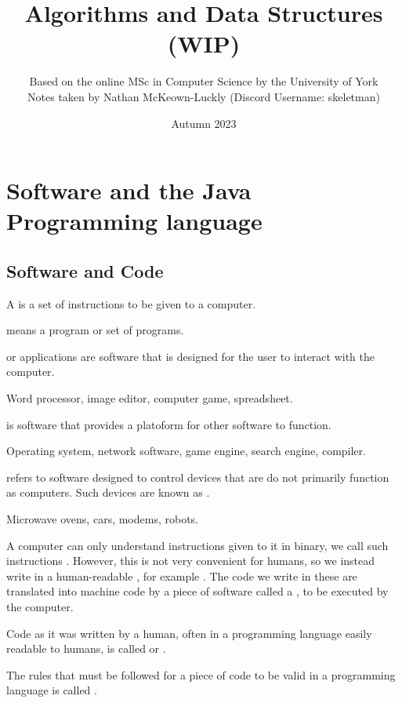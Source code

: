 \documentclass[11pt]{article}
\title{Algorithms and Data Structures (WIP)}
\date{Autumn 2023}
\author{Based on the online MSc in Computer Science by the University of York\\ Notes taken by Nathan McKeown-Luckly (Discord Username: skeletman)}
\begin{document}
\maketitle
\tableofcontents
\pagebreak
\section{Software and the Java Programming language}
\subsection{Software and Code}
\begin{defi}
    A  is a set of instructions to be given to a computer.
\end{defi}
\begin{defi}[Software]
     means a program or set of programs.
\end{defi}
\begin{defi}
     or \textrm{applications} are software that is designed for the user to interact with the computer.
\end{defi}
\begin{egs}
    Word processor, image editor, computer game, spreadsheet.
\end{egs}
\begin{defi}
     is software that provides a platoform for other software to function.
\end{defi}
\begin{egs}
    Operating system, network software, game engine, search engine, compiler.
\end{egs}
\begin{defi}
     refers to software designed to control devices that are do not primarily function as computers. Such devices are known as .
\end{defi}
\begin{egs}
    Microwave ovens, cars, modems, robots.
\end{egs}
A computer can only understand instructions given to it in binary, we call such instructions . However, this is not very convenient for humans, so we instead write in a human-readable , for example . The code we write in these are translated into machine code by a piece of software called a , to be executed by the computer.
\begin{defi}
    Code as it was written by a human, often in a programming language easily readable to humans, is called  or .
\end{defi}
\begin{defi}[Syntax]
    The rules that must be followed for a piece of code to be valid in a programming language is called .
\end{defi}
\pagebreak
\end{document}
